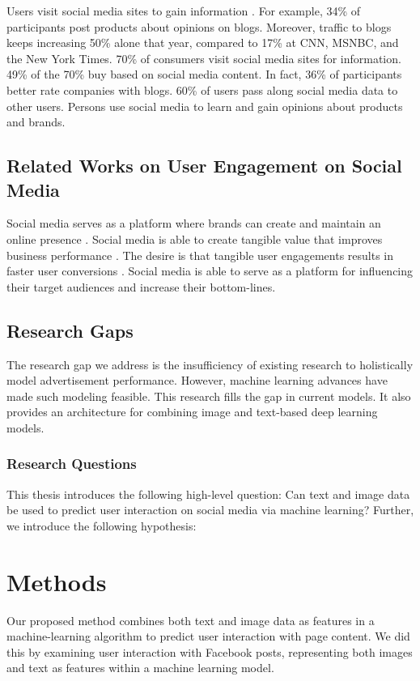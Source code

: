 \documentclass{article}
\begin{document}
Users visit social media sites to gain information \cite{Fisher2009}. For example, 34\% of participants post products about opinions on blogs. Moreover, traffic to blogs keeps increasing 50\% alone that year, compared to 17\% at CNN, MSNBC, and the New York Times. 70\% of consumers visit social media sites for information. 49\% of the 70\% buy based on social media content. In fact, 36\% of participants better rate companies with blogs. 60\% of users pass along social media data to other users. Persons use social media to learn and gain opinions about products and brands.

\subsection{Related Works on User Engagement on Social Media}
Social media serves as a platform where brands can create and maintain an online presence \cite{Greenwood2016}. Social media is able to create tangible value that improves business performance \cite{Authors2013}. The desire is that tangible user engagements results in faster user conversions \cite{Authors2013}. Social media is able to serve as a platform for influencing their target audiences and increase their bottom-lines.

\subsection{Research Gaps}
The research gap we address is the insufficiency of existing research to holistically model advertisement performance. However, machine learning advances have made such modeling feasible. This research fills the gap in current models. It also provides an architecture for combining image and text-based deep learning models.

\subsubsection{Research Questions}
This thesis introduces the following high-level question: Can text and image data be used to predict user interaction on social media via machine learning?  Further, we introduce the following hypothesis:
    

\section{Methods}
Our proposed method combines both text and image data as features in a machine-learning algorithm to predict user interaction with page content. We did this by examining user interaction with Facebook posts, representing both images and text as features within a machine learning model.
\end{document}
